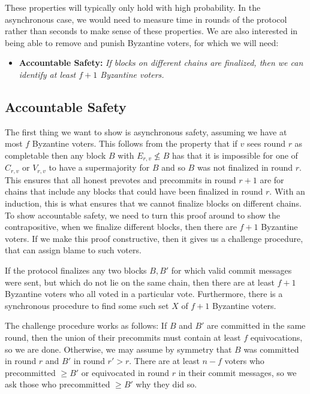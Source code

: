 \documentclass[a4paper,UKenglish,cleveref, autoref, thm-restate, anonymous]{lipics-v2019}
\begin{document}
These properties will typically only hold with high probability. In the asynchronous case, we would need to measure time in rounds of the protocol rather than seconds to make sense of these properties.  We are also interested in being able to remove and punish Byzantine voters, for which we will need:

\begin{itemize}
    \item{\bf Accountable Safety:} {\em If blocks on different chains are finalized, then we can identify at least $f+1$ Byzantine voters.}
\end{itemize}



\subsection{ Accountable Safety}

The first thing we want to show is asynchronous safety, assuming we have at most $f$ Byzantine voters. This follows from the property that if $v$ sees round $r$ as completable then any block $B$ with $E_{r,v} \not\leq B$ has that it is impossible for one of $C_{r,v}$ or $V_{r,v}$ to have a supermajority for $B$ and so $B$ was not finalized in round $r$. This ensures that all honest prevotes and precommits in round $r+1$ are for chains that include any blocks that could have been finalized in round $r$. With an induction, this is what ensures that we cannot finalize blocks on different chains. To show accountable safety, we need to turn this proof around to show the contrapositive, when we finalize different blocks, then there are $f+1$ Byzantine voters. If we make this proof constructive, then it gives us a challenge procedure, that can assign blame to such voters.

\begin{theorem} \label{thm:accountable} If the protocol finalizes any two blocks $B,B'$ for which valid commit messages were sent, but which do not lie on the same chain, then there are at least $f+1$ Byzantine voters who all voted in a particular vote. Furthermore, there is a synchronous procedure to find some such set $X$ of $f+1$ Byzantine voters.
\end{theorem}

The challenge procedure works as follows: If $B$ and $B'$ are committed in the same round, then the union of their precommits must contain at least $f$ equivocations, so we are done.  Otherwise, we may assume by symmetry that $B$ was committed in round $r$ and $B'$ in round $r' > r$.  There are at least $n-f$ voters who precommitted $\geq B'$ or equivocated in round $r$ in their commit messages, so we ask those who precommitted $\geq B'$ why they did so.
\end{document}

